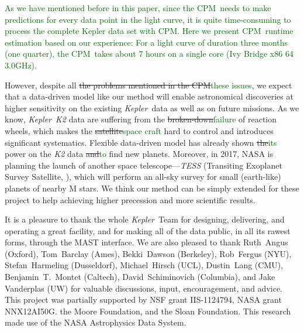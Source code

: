 \documentclass[12pt, preprint]{aastex}
\newcommand{\project}[1]{\textsl{#1}}
\newcommand{\Kepler}{\project{Kepler}}
\newcommand{\name}{CPM}
\newcommand{\revise}[1]{\textcolor{darkgreen}{#1}}
\newcommand{\remove}[1]{\sout{#1}}
\begin{document}
\revise{As we have mentioned before in this paper,  since the \name\ needs to make predictions for every data point in the light curve, it is quite time-consuming to process the complete Kepler data set with \name. Here we present \name\ runtime estimation based on our experience: For a light curve of duration three months (one quarter), the \name\ takes about 7 hours on a single core (Ivy Bridge x86 64 3.0GHz).}

However, despite all \remove{the problems mentioned in the \name}\revise{these issues}, we expect that a data-driven model like our method will enable astronomical discoveries at higher sensitivity on the existing \Kepler\ data as well as on future missions.  
As we know, \Kepler\ \project{K2} \citep{k2} data are suffering from the \remove{broken-down}\revise{failure} of reaction wheels,  which makes the \remove{satellite}\revise{space craft} hard to control and introduces significant systematics. 
Flexible data-driven model \citep{dfm} has already shown \remove{the}\revise{its} power on the \project{K2} data \remove{and}\revise{to} find new planets.
Moreover, in 2017, NASA is planning the launch of another space telescope---\project{TESS} (Transiting Exoplanet Survey Satellite, \citealt{tess}), 
  which will perform an all-sky survey for small (earth-like) planets of nearby M stars. 
  We think our method can be simply extended for these project to help achieving higher precession and more scientific results. 


\acknowledgements
It is a pleasure to thank the whole \Kepler\ Team
  for designing, delivering, and operating a great facility,
  and for making all of the data public, in all its rawest forms, through the MAST interface.
We are also pleased to thank
  Ruth~Angus (Oxford),
  Tom~Barclay (Ames),
  Bekki~Dawson (Berkeley),
  Rob~Fergus (NYU),
  Stefan~Harmeling (Dusseldorf),
  Michael~Hirsch (UCL),
  Dustin~Lang (CMU),
  Benjamin~T.~Montet (Caltech),
  David~Schiminovich (Columbia),
  and
  Jake Vanderplas (UW)
for valuable discussions, input, encouragement, and advice.
This project was partially supported by
  NSF grant IIS-1124794,
  NASA grant NNX12AI50G.
  the Moore Foundation,
  and
  the Sloan Foundation.
This research made use of the NASA Astrophysics Data System.

\clearpage

%
\clearpage
\end{document}
